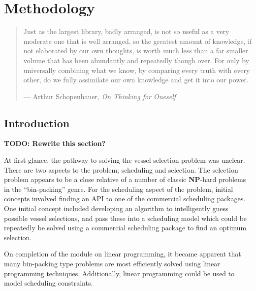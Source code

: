%
%
%
%

\chapter{Methodology}\label{C.methodology}

\begin{quote}
Just as the largest library, badly arranged, is not so useful as a very
moderate one that is well arranged, so the greatest amount of knowledge, if not
elaborated by our own thoughts, is worth much less than a far smaller volume
that has been abundantly and repeatedly though over.  For only by universally
combining what we know, by comparing every truth with every other, do we fully
assimilate our own knowledge and get it into our power.

\hspace{2cm}--- Arthur Schopenhauer, \emph{On Thinking for Oneself}
\end{quote}

\section{Introduction}\label{S.intro4}

\textbf{TODO: Rewrite this section?}

At first glance, the pathway to solving the vessel selection problem was
unclear.
There are two aspects to the problem; scheduling and selection.
The selection problem appears to be a close relative of a number of classic
\textbf{NP}-hard problems in the ``bin-packing'' genre.
For the scheduling aspect of the problem, initial concepts involved finding an
API to one of the commercial scheduling packages.
One initial concept included developing an algorithm to intelligently guess
possible vessel selections, and pass these into a scheduling model which
could be repeatedly be solved using a commercial scheduling package
to find an optimum selection.

On completion of the module on linear programming, it became apparent that
many bin-packing type problems are most efficiently solved using linear
programming techniques.
Additionally, linear programming could be used to model scheduling constraints.


